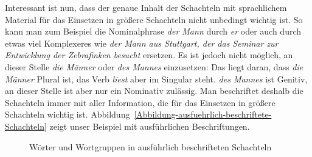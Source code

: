 \documentclass[ number=45
			   ,series=eotms
			   ,printondemand
			  ]{langsci}
\begin{document}
Interessant ist nun, dass der genaue Inhalt der Schachteln mit sprachlichem Material für das
Einsetzen in größere Schachteln nicht unbedingt wichtig ist. So kann man zum Beispiel die
Nominalphrase \emph{der Mann} durch \emph{er} oder auch durch etwas viel Komplexeres wie \emph{der
  Mann aus Stuttgart, der das Seminar zur Entwicklung der Zebrafinken besucht} ersetzen. Es ist
jedoch nicht möglich, an dieser Stelle \emph{die Männer} oder \emph{des Mannes} einzusetzen: 
\eal 
{} 
\zl 
Das liegt daran, dass \emph{die Männer} Plural ist, das Verb
\emph{liest} aber im Singular steht. \emph{des Mannes} ist Genitiv, an dieser Stelle ist aber nur
ein Nominativ zulässig. Man beschriftet deshalb die Schachteln immer mit aller Information, die für
das Einsetzen in größere Schachteln wichtig
ist. Abbildung~\vref{Abbildung-ausfuehrlich-beschriftete-Schachteln} zeigt unser Beispiel mit 
ausführlichen Beschriftungen.
\begin{figure}[htbp]
\caption{\label{Abbildung-ausfuehrlich-beschriftete-Schachteln}Wörter und Wortgruppen in ausführlich beschrifteten Schachteln}
\end{figure}
\end{document}
